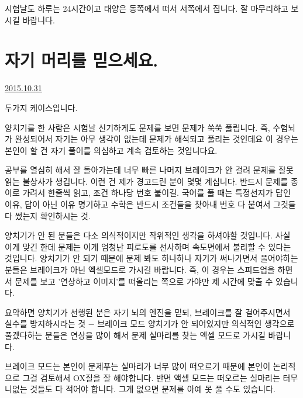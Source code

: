 시험날도 하루는 24시간이고 태양은 동쪽에서 떠서 서쪽에서 집니다. 잘 마무리하고 보시길 바랍니다.
\vspace{5mm}






\section{자기 머리를 믿으세요.}
\href{https://www.kockoc.com/Apoc/458132}{2015.10.31}

\vspace{5mm}

두가지 케이스입니다.
\vspace{5mm}

양치기를 한 사람은 시험날 신기하게도 문제를 보면 문제가 쑥쑥 풀립니다.
즉, 수험뇌가 완성되어서 자기는 아무 생각이 없는데 문제가 해석되고 풀리는 것인데요
이 경우는 본인이 할 건 자기 풀이를 의심하고 계속 검토하는 것입니다요.
\vspace{5mm}

공부를 열심히 해서 잘 돌아가는데 너무 빠른 나머지 브레이크가 안 걸려 문제를 잘못 읽는 불상사가  생깁니다.
이런 건 제가 경고드린 분이 몇몇 계십니다. 반드시 문제를 종이로 가려서 한줄씩 읽고, 조건 하나당 번호 붙이길.
국어를 풀 때는 특정선지가 답인 이유, 답이 아닌 이유 명기하고
수학은 반드시 조건들을 찾아내 번호 다 붙여서 그것들 다 썼는지 확인하시는 것.
\vspace{5mm}

양치기가 안 된 분들은 다소 의식적이지만 작위적인 생각을 하셔야할 것입니다. 사실 이게 맞긴 한데
문제는 이게 엄청난 피로도를 선사하며 속도면에서 불리할 수 있다는 것입니다.
양치기가 안 되기 때문에 문제 봐도 하나하나 자기가 써나가면서 풀어야하는 분들은 브레이크가 아닌 엑셀모드로 가시길 바랍니다.
즉, 이 경우는 스피드업을 하면서 문제를 보고 '연상하고 이미지'를 떠올리는 쪽으로 가야만 제 시간에 맞출 수 있습니다.
\vspace{5mm}

요약하면
양치기가 선행된 분은 자기 뇌의 엔진을 믿되, 브레이크를 잘 걸어주시면서 실수를 방지하시라는 것 $-$ 브레이크 모드
양치기가 안 되어있지만 의식적인 생각으로 풀겠다하는 분들은 연상을 많이 해서 문제 실마리를 찾는 엑셀 모드로 가시길 바랍니다.
\vspace{5mm}

브레이크 모드는 본인이 문제푸는 실마리가 너무 많이 떠오르기 때문에 본인이 논리적으로 그걸 검토해서 OX질을 잘 해야합니다.
반면 액셀 모드는 떠오르는 실마리는 터무니없는 것들도 다 적어야 합니다. 그게 없으면 문제를 아예 못 풀 수도 있습니다.
\vspace{5mm}

